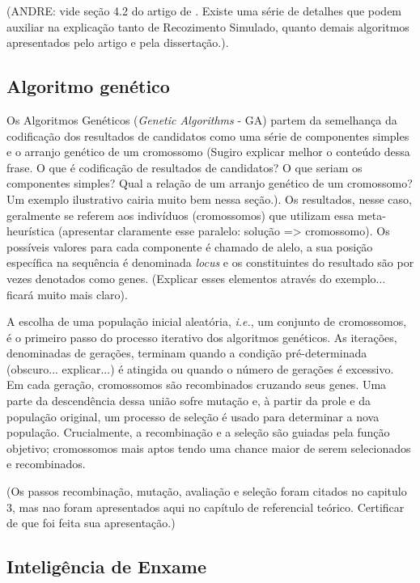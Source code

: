 (ANDRE: vide seção 4.2 do artigo de \cite{youssef2001167}. Existe uma série de detalhes que podem auxiliar na explicação tanto de Recozimento Simulado, quanto demais algoritmos apresentados pelo artigo e pela dissertação.).


\subsection{Algoritmo genético}

Os Algoritmos Genéticos (\textit{Genetic Algorithms} - GA) partem da semelhança da codificação dos resultados de candidatos como uma série de componentes simples e o arranjo genético de um cromossomo \cite{alander1998genetic} (Sugiro explicar melhor o conteúdo dessa frase. O que é codificação de resultados de candidatos? O que seriam os componentes simples? Qual a relação de um arranjo genético de um cromossomo? Um exemplo ilustrativo cairia muito bem nessa seção.). Os resultados, nesse caso, geralmente se referem aos indivíduos (cromossomos) que utilizam essa meta-heurística (apresentar claramente esse paralelo: solução => cromossomo). Os possíveis valores para cada componente é chamado de alelo, a sua posição específica na sequência é denominada \textit{locus} e os constituintes do resultado são por vezes denotados como genes. (Explicar esses elementos através do exemplo... ficará muito mais claro).

A escolha de uma população inicial aleatória, \textit{i.e.}, um conjunto de cromossomos, é o primeiro passo do processo iterativo dos algoritmos genéticos.  As iterações, denominadas de gerações, terminam quando a condição pré-determinada (obscuro... explicar...) é atingida ou quando o número de gerações é excessivo. Em cada geração, cromossomos são recombinados cruzando seus genes. Uma parte da descendência dessa união sofre mutação e, à partir da prole e da população original, um processo de seleção é usado para determinar a nova população.  Crucialmente, a recombinação e a seleção são guiadas pela função objetivo; cromossomos mais aptos tendo uma chance maior de serem selecionados e recombinados.

(Os passos recombinação, mutação, avaliação e seleção foram citados no
capitulo 3, mas nao foram apresentados aqui no capítulo de referencial teórico.
Certificar de que foi feita sua apresentação.)


\subsection{Inteligência de Enxame}

